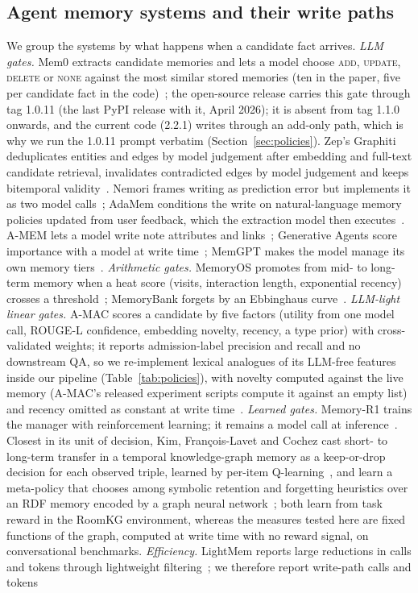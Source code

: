 \documentclass{ceurart}
\begin{document}
\subsection{Agent memory systems and their write paths}
We group the systems by what happens when a candidate fact arrives. \emph{LLM gates.} Mem0 extracts candidate memories and lets a model choose \textsc{add}, \textsc{update}, \textsc{delete} or \textsc{none} against the most similar stored memories (ten in the paper, five per candidate fact in the code)~\cite{chhikara2025mem0}; the open-source release carries this gate through tag 1.0.11 (the last PyPI release with it, April 2026); it is absent from tag 1.1.0 onwards, and the current code (2.2.1) writes through an add-only path, which is why we run the 1.0.11 prompt verbatim (Section~\ref{sec:policies}). Zep's Graphiti deduplicates entities and edges by model judgement after embedding and full-text candidate retrieval, invalidates contradicted edges by model judgement and keeps bitemporal validity~\cite{rasmussen2025zep,graphiti}. Nemori frames writing as prediction error but implements it as two model calls~\cite{nemori2025}; AdaMem conditions the write on natural-language memory policies updated from user feedback, which the extraction model then executes~\cite{chen2026adamem}. A-MEM lets a model write note attributes and links~\cite{xu2025amem}; Generative Agents score importance with a model at write time~\cite{park2023generative}; MemGPT makes the model manage its own memory tiers~\cite{packer2023memgpt}. \emph{Arithmetic gates.} MemoryOS promotes from mid- to long-term memory when a heat score (visits, interaction length, exponential recency) crosses a threshold~\cite{kang2025memoryos}; MemoryBank forgets by an Ebbinghaus curve~\cite{zhong2024memorybank}. \emph{LLM-light linear gates.} A-MAC scores a candidate by five factors (utility from one model call, ROUGE-L confidence, embedding novelty, recency, a type prior) with cross-validated weights; it reports admission-label precision and recall and no downstream QA, so we re-implement lexical analogues of its LLM-free features inside our pipeline (Table~\ref{tab:policies}), with novelty computed against the live memory (A-MAC's released experiment scripts compute it against an empty list) and recency omitted as constant at write time~\cite{zhang2026amac}. \emph{Learned gates.} Memory-R1 trains the manager with reinforcement learning; it remains a model call at inference~\cite{yan2025memoryr1}. Closest in its unit of decision, Kim, Fran\c{c}ois-Lavet and Cochez cast short- to long-term transfer in a temporal knowledge-graph memory as a keep-or-drop decision for each observed triple, learned by per-item Q-learning~\cite{kim2026stltm}, and learn a meta-policy that chooses among symbolic retention and forgetting heuristics over an RDF memory encoded by a graph neural network~\cite{kim2026metapolicy}; both learn from task reward in the RoomKG environment, whereas the measures tested here are fixed functions of the graph, computed at write time with no reward signal, on conversational benchmarks. \emph{Efficiency.} LightMem reports large reductions in calls and tokens through lightweight filtering~\cite{fang2025lightmem}; we therefore report write-path calls and tokens 
\end{document}
